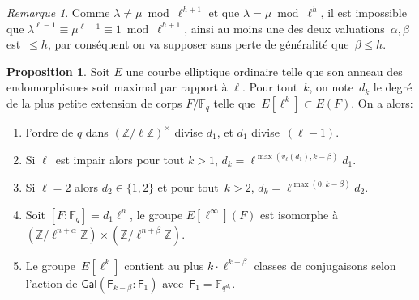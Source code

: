 \documentclass[10pt,a4paper]{book}
\theoremstyle{plain}
\theoremstyle{definition}
\theoremstyle{definition}
\theoremstyle{definition}
\newtheorem{prop}[thm]{Proposition}
\theoremstyle{definition}
\theoremstyle{remark}
\newtheorem{rem}[thm]{Remarque}
\theoremstyle{remark}
\theoremstyle{definition}
\begin{document}
\begin{rem} 
Comme $\lambda \neq \mu \bmod{\ell^{h+1}}$
et que $\lambda = \mu \bmod \ell^h$, il est impossible que $\lambda^{\ell-1} 
\equiv \mu^{\ell-1} \equiv 1 \bmod{\ell^{h+1}}$, ainsi au moins une des deux 
valuations~$\alpha, \beta$ est~$\leqslant h$, par conséquent on va supposer 
sans perte de généralité que~$\beta \leqslant h$.
\end{rem}

\begin{prop}\label{pro:clas:fro}
Soit $E$ une courbe elliptique ordinaire telle que son anneau des endomorphismes 
soit maximal par rapport à $\ell$. Pour tout~$k$, on note~$d_k$ le degré de la 
plus petite extension de corps $F/\mathbb{F}_q$ telle que~$E[\ell^k]\subset 
E(F)$. On  a alors:
\begin{enumerate}
\item \label{ite:pro:cla:1} l'ordre de $q$ dans $(\mathbb{Z}/ \ell \mathbb{Z})^\times$ divise $d_1$,
et $d_1$ divise~$(\ell-1)$.
\item \label{ite:pro:cla:2} Si $\ell$~est impair alors pour tout $k > 1$,
$ d_k = \ell^{\max (v_{\ell} (d_1), k - \beta)}d_1$.
\item \label{ite:pro:cla:3} Si $\ell=2$ alors $d_2 \in \{1,2\}$ et pour tout~$k > 2$,
$d_k = \ell^{\max (0, k - \beta)}d_2$.
\item \label{ite:pro:cla:4} Soit $[F:\mathbb{F}_q]=d_1\ell^n$, le groupe $E[\ell^{\infty}](F)$ est isomorphe à~$(\mathbb{Z}/\ell^{n+\alpha} \mathbb{Z}) \times (\mathbb{Z}/\ell^{n+\beta} \mathbb{Z})$.
\item\label{prop:classes:count} Le groupe~$E[\ell^k]$ contient au plus
$k \cdot \ell^{k+\beta}$ classes de conjugaisons selon l'action de $\mathsf{Gal}(\mathsf{F}_{k-\beta}:\mathsf{F}_1)$ avec~$\mathsf{F}_1 = \mathbb{F}_{q^{d_1}}$.
\end{enumerate}
\end{prop}
\end{document}
